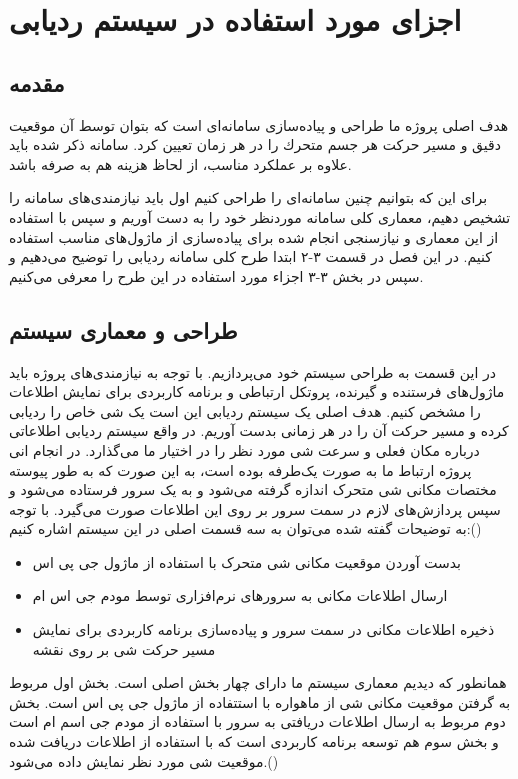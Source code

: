 \chapter{اجزای مورد استفاده در سیستم ردیابی}

\section{مقدمه}
هدف اصلی پروژه ما طراحی و پياده‌سازی سامانه‌ای است كه بتوان توسط آن موقعيت دقيق و مسير حركت هر جسم متحرك را در هر زمان تعيين كرد. سامانه ذکر شده باید علاوه بر عملکرد مناسب، از لحاظ هزینه هم به صرفه باشد.


برای این که بتوانیم چنین سامانه‌ای را طراحی کنیم اول باید نیازمندی‌های سامانه را تشخیص دهیم، معماری کلی سامانه موردنظر خود را به دست آوریم و سپس با استفاده از این معماری و نیازسنجی انجام شده برای پیاده‌سازی از ماژول‌های مناسب استفاده کنیم. در این فصل در قسمت ۳-۲ ابتدا طرح کلی سامانه ردیابی را توضیح می‌دهیم و سپس در بخش ۳-۳ اجزاء مورد استفاده در این طرح را معرفی می‌کنیم.
\section{طراحی و معماری سیستم}
در این قسمت به طراحی سیستم خود می‌پردازیم. با توجه به نیازمندی‌های پروژه باید ماژول‌های فرستنده و گیرنده، پروتکل ارتباطی و برنامه کاربردی برای نمایش اطلاعات را مشخص کنیم.
هدف اصلی یک سیستم ردیابی این است یک شی خاص را ردیابی کرده و مسیر حرکت آن را در هر زمانی بدست آوریم. در واقع سیستم ردیابی اطلاعاتی درباره مکان فعلی و سرعت شی مورد نظر را در اختیار ما می‌گذارد. در انجام انی پروژه ارتباط ما به صورت یک‌طرفه بوده است، به این صورت که به طور پیوسته مختصات مکانی شی متحرک اندازه گرفته می‌شود و به یک سرور فرستاده می‌شود و سپس پردازش‌های لازم در سمت سرور بر روی این اطلاعات صورت می‌گیرد. با توجه به توضیحات گفته شده می‌توان به سه قسمت اصلی در این سیستم اشاره کنیم:()
\begin{itemize}
	\item
بدست آوردن موقعیت مکانی شی متحرک با استفاده از ماژول جی پی اس
	\item
	ارسال اطلاعات مکانی به سرورهای نرم‌افزاری توسط مودم جی اس ام
	\item
	ذخیره اطلاعات مکانی در سمت سرور و پیاده‌سازی برنامه کاربردی برای نمایش مسیر حرکت شی بر روی نقشه
\end{itemize} 
همانطور که دیدیم معماری سیستم ما دارای چهار بخش اصلی است. بخش اول مربوط به گرفتن موقعیت مکانی شی از ماهواره با استتفاده از ماژول جی پی اس است. بخش دوم مربوط به ارسال اطلاعات دریافتی به سرور با استفاده از مودم جی اسم ام است و بخش سوم هم توسعه برنامه کاربردی است که با استفاده از اطلاعات دریافت شده موقعیت شی مورد نظر نمایش داده می‌شود.()

